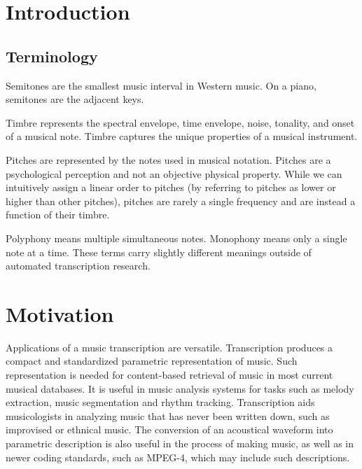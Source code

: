 \documentclass[5p]{elsarticle}
\begin{document}
\setcounter{topnumber}{1}

\section{Introduction}


\subsection{Terminology}
Semitones are the smallest music interval in Western music. On a piano, semitones are the adjacent keys.

Timbre represents the spectral envelope, time envelope, noise, tonality, and onset of a musical note. Timbre captures the unique properties of a musical instrument.

Pitches are represented by the notes used in musical notation. Pitches are a psychological perception and not an objective physical property. While we can intuitively assign a linear order to pitches (by referring to pitches as lower or higher than other pitches), pitches are rarely a single frequency and are instead a function of their timbre.

Polyphony means multiple simultaneous notes. Monophony means only a single note at a time. These terms carry slightly different meanings outside of automated transcription research.

\section{Motivation}



Applications of a music transcription are versatile. Transcription produces a compact and standardized parametric representation of music. Such representation is needed for content-based retrieval of music in most current musical databases. It is useful in music analysis systems for tasks such as melody extraction, music segmentation and rhythm tracking. Transcription aids musicologists in analyzing music that has never been written down, such as improvised or ethnical music. The conversion of an acoustical waveform into parametric description is also useful in the process of making music, as well as in newer coding standards, such as MPEG-4, which may include such descriptions.
\end{document}
